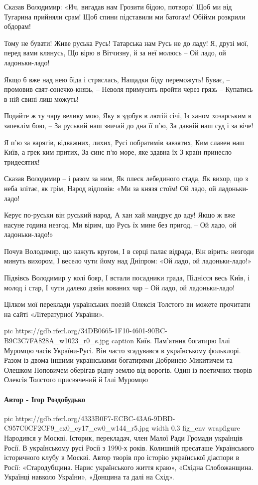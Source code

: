 \begin{multicols}{2}
        \obeycr
Сказав Володимир: «Ич, вигадав нам
Грозити бідою, потворо!
Щоб ми від Тугарина прийняли срам!
Щоб спини підставили ми батогам!
Обійми розкрили обдорам!

Тому не бувати! Живе руська Русь!
Татарська нам Русь не до ладу!
Я, друзі мої, перед вами клянусь,
Що вірю в Вітчизну, й за неї молюсь –
Ой ладо, ой ладоньки-ладо!

Якщо б вже над нею біда і стряслась,
Нащадки біду переможуть!
Буває, – промовив свят-сонечко-князь, –
Неволя примусить пройти через грязь –
Купатись в ній свині лиш можуть!

Подайте ж ту чару велику мою,
Яку я здобув в лютій січі,
Із ханом хозарським в запеклім бою, –
За руський наш звичай до дна її п’ю,
За давній наш суд і за віче!

Я п’ю за варягів, відважних, лихих,
Русі побратимів завзятих,
Ким славен наш Київ, а грек ким притих,
За синє п’ю море, яке здавна їх
З країн принесло тридесятих!

Сказав Володимир – і разом за ним,
Як плеск лебединого стада,
Як вихор, що з неба злітає, як грім,
Народ відповів: «Ми за князя стоїм!
Ой ладо, ой ладоньки-ладо!

Керує по-руськи він руський народ,
А хан хай мандрує до аду!
Якщо ж вже насуне година незгод,
Ми вірим, що Русь їх мине без пригод, –
Ой ладо, ой ладоньки-ладо!»

Почув Володимир, що кажуть кругом,
І в серці палає відрада,
Він вірить: незгоди минуть вихором,
І весело чути йому над Дніпром:
«Ой ладо, ой ладоньки-ладо!»

Підвівсь Володимир у колі бояр,
І встали посадники града,
Піднісся весь Київ, і молод і стар,
І чути далеко дзвін кованих чар –
Ой ладо, ой ладоньки-ладо!
        \restorecr
\end{multicols}

Цілком мої переклади українських поезій Олексія Толстого ви можете прочитати на
сайті «Літературної України».

\ifcmt
pic https://gdb.rferl.org/34DB0665-1F10-4601-90BC-B9C3C7FA828A_w1023_r0_s.jpg
caption Київ. Пам'ятник богатирю Іллі Муромцю часів України-Русі. Він часто згадувався в українському фольклорі. Разом із двома іншими українськими богатирями Добринею Микитичем та Олешком Поповичем оберігав рідну землю від ворогів. Один із поетичних творів Олексія Толстого присвячений й Іллі Муромцю
\fi

\paragraph{Автор - Ігор Роздобудько}


\ifcmt
pic https://gdb.rferl.org/4333B0F7-ECBC-43A6-9DBD-C957C0CF2CF9_cx0_cy17_cw0_w144_r5.jpg
width 0.3
fig_env wrapfigure
\fi
Народився у Москві. Історик, перекладач, член Малої Ради Громади українців
Росії. В українському русі Росії з 1990-х років. Колишній пресаташе
Українського історичного клубу в Москві. Автор творів про історію
української діаспори в Росії: «Стародубщина. Нарис українського життя
краю», «Східна Слобожанщина. Українці навколо України», «Донщина та
далі на Схід». 
